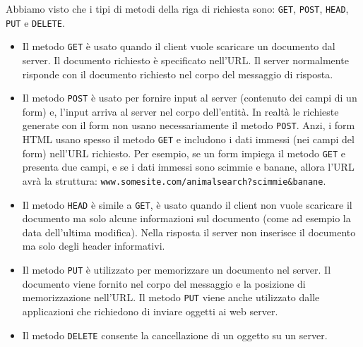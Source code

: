 Abbiamo visto che i tipi di metodi della riga di richiesta sono: \verb|GET|, \verb|POST|, \verb|HEAD|, \verb|PUT| e \verb|DELETE|.
\begin{itemize}
    \item Il metodo \verb|GET| è usato quando il client vuole scaricare un documento dal server. Il documento richiesto è specificato nell'URL. Il server normalmente risponde con il documento richiesto nel corpo del messaggio di risposta.
    \item Il metodo \verb|POST| è usato per fornire input al server (contenuto dei campi di un form) e, l'input arriva al server nel corpo dell'entità. In realtà le richieste generate con il form non usano necessariamente il metodo \verb|POST|. Anzi, i form HTML usano spesso il metodo \verb|GET| e includono i dati immessi (nei campi del form) nell'URL richiesto. Per esempio, se un form impiega il metodo \verb|GET| e presenta due campi, e se i dati immessi sono scimmie e banane, allora l'URL avrà la struttura: \verb|www.somesite.com/animalsearch?scimmie&banane|. 
    \item Il metodo \verb|HEAD| è simile a \verb|GET|, è usato quando il client non vuole scaricare il documento ma solo alcune informazioni sul documento (come ad esempio la data dell'ultima modifica). Nella risposta il server non inserisce il documento ma solo degli header informativi.
    \item Il metodo \verb|PUT| è utilizzato per memorizzare un documento nel server. Il documento viene fornito nel corpo del messaggio e la posizione di memorizzazione nell'URL. Il metodo \verb|PUT| viene anche utilizzato dalle applicazioni che richiedono di inviare oggetti ai web server. 
    \item Il metodo \verb|DELETE| consente la cancellazione di un oggetto su un server.
\end{itemize}

